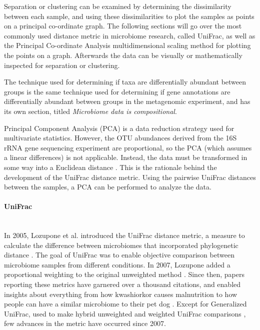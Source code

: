 Separation or clustering can be examined by determining the dissimilarity between each sample, and using these dissimilarities to plot the samples as points on a principal co-ordinate graph. The following sections will go over the most commonly used distance metric in microbiome research, called UniFrac, as well as the Principal Co-ordinate Analysis multidimensional scaling method for plotting the points on a graph. Afterwards the data can be visually or mathematically inspected for separation or clustering.

The technique used for determining if taxa are differentially abundant between groups is the same technique used for determining if gene annotations are differentially abundant between groups in the metagenomic experiment, and has its own section, titled \textit{Microbiome data is compositional}.

Principal Component Analysis (PCA) is a data reduction strategy used for multivariate statistics. However, the OTU abundances derived from the 16S rRNA gene sequencing experiment are proportional, so the PCA (which assumes a linear differences) is not applicable. Instead, the data must be transformed in some way into a Euclidean distance \cite{anderson2003canonical}. This is the rationale behind the development of the UniFrac distance metric. Using the pairwise UniFrac distances between the samples, a PCA can be performed to analyze the data.

\paragraph{UniFrac}\mbox{}\\
In 2005, Lozupone et al. introduced the UniFrac distance metric, a measure to calculate the difference between microbiomes that incorporated phylogenetic distance \cite{lozupone2005unifrac}. The goal of UniFrac was to enable objective comparison between microbiome samples from different conditions. In 2007, Lozupone added a proportional weighting to the original unweighted method \cite{lozupone2007quantitative}. Since then, papers reporting these metrics have garnered over a thousand citations, and enabled insights about everything from how kwashiorkor causes malnutrition \cite{smith2013gut} to how people can have a similar microbiome to their pet dog \cite{song2013cohabiting}.  Except for Generalized UniFrac, used to make hybrid unweighted and weighted UniFrac comparisons \cite{chen2012associating}, few advances in the metric have occurred since 2007. 

